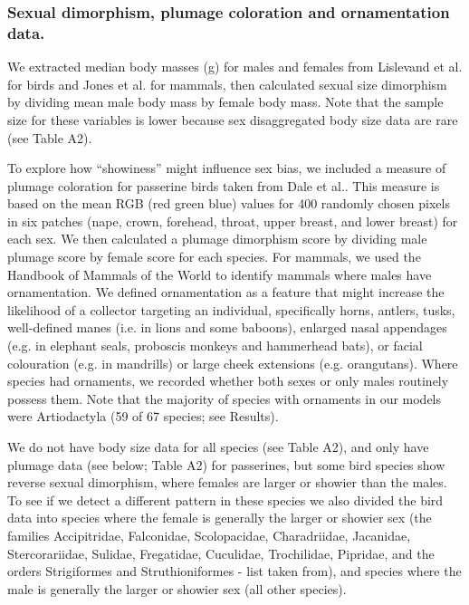 \documentclass[a4paper, 12pt]{article}
\begin{document}
\subsubsection{Sexual dimorphism, plumage coloration and ornamentation data.}
We extracted median body masses (g) for males and females from Lislevand et al.\cite{lislevand2007avian} for birds and Jones et al.\cite{pantheria} for mammals, then calculated sexual size dimorphism by dividing mean male body mass by female body mass. 
Note that the sample size for these variables is lower because sex disaggregated body size data are rare (see Table A2).

To explore how ``showiness'' might influence sex bias, we included a measure of plumage coloration for passerine birds taken from Dale et al.\cite{dale2015data,dale2015effects}. 
This measure is based on the mean RGB (red green blue) values for 400 randomly chosen pixels in six patches (nape, crown, forehead, throat, upper breast, and lower breast) for each sex. 
We then calculated a plumage dimorphism score by dividing male plumage score by female score for each species. 
For mammals, we used the Handbook of Mammals of the World to identify mammals where males have ornamentation. 
We defined ornamentation as a feature that might increase the likelihood of a collector targeting an individual, specifically horns, antlers, tusks, well-defined manes (i.e. in lions and some baboons), enlarged nasal appendages (e.g. in elephant seals, proboscis monkeys and hammerhead bats), or facial colouration (e.g. in mandrills) or large cheek extensions (e.g. orangutans). 
Where species had ornaments, we recorded whether both sexes or only males routinely possess them. 
Note that the majority of species with ornaments in our models were Artiodactyla (59 of 67 species; see Results). 

We do not have body size data for all species (see Table A2), and only have plumage data (see below; Table A2) for passerines, but some bird species show reverse sexual dimorphism, where females are larger or showier than the males. 
To see if we detect a different pattern in these species we also divided the bird data into species where the female is generally the larger or showier sex (the families  Accipitridae, Falconidae, Scolopacidae, Charadriidae, Jacanidae, Stercorariidae, Sulidae, Fregatidae, Cuculidae, Trochilidae, Pipridae, and the orders Strigiformes and Struthioniformes - list taken from\cite{swaddle2000novel}), and species where the male is generally the larger or showier sex (all other species). 
\end{document}
